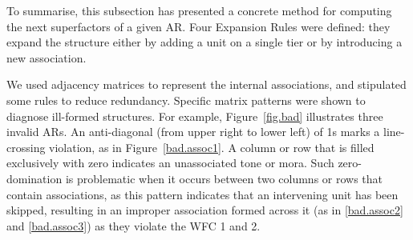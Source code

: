 To summarise, this subsection has presented a concrete method for
computing the next superfactors of a given AR. Four Expansion Rules
were defined: they expand the structure either by adding a unit on a
single tier or by introducing a new association.

We used adjacency matrices to represent the internal associations, and
stipulated some rules to reduce redundancy. Specific matrix patterns
were shown to diagnose ill-formed structures. For example,
Figure~\ref{fig.bad} illustrates three invalid ARs. An
anti-diagonal (from upper right to lower left) of 1s marks a
line-crossing violation, as in Figure~\ref{bad.assoc1}. A column or
row that is filled exclusively with zero indicates an unassociated tone or mora. Such zero-domination is
problematic when it occurs between two columns or rows that contain
associations, as this pattern indicates that an intervening unit has
been skipped, resulting in an improper association formed across it
(as in \ref{bad.assoc2} and \ref{bad.assoc3}) as they violate the
WFC 1 and 2.

